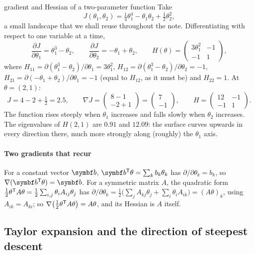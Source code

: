 \documentclass[11pt]{article}
\begin{document}
\begin{worked}{gradient and Hessian of a two-parameter function}
Take
\[
  J(\theta_1, \theta_2) = \tfrac14\theta_1^4 - \theta_1\theta_2 + \tfrac12\theta_2^2 ,
\]
a small landscape that we shall reuse throughout the note. Differentiating with respect to one variable at a time,
\[
  \frac{\partial J}{\partial\theta_1} = \theta_1^3 - \theta_2, \qquad
  \frac{\partial J}{\partial\theta_2} = -\theta_1 + \theta_2, \qquad
  H(\theta) = \begin{pmatrix} 3\theta_1^2 & -1 \\ -1 & 1 \end{pmatrix},
\]
where $H_{11} = \partial(\theta_1^3 - \theta_2)/\partial\theta_1 = 3\theta_1^2$, $H_{12} = \partial(\theta_1^3 - \theta_2)/\partial\theta_2 = -1$,
$H_{21} = \partial(-\theta_1 + \theta_2)/\partial\theta_1 = -1$ (equal to $H_{12}$, as it must be) and $H_{22} = 1$.
At $\theta = (2, 1)$:
\[
  J = 4 - 2 + \tfrac12 = 2.5, \qquad \nabla J = \begin{pmatrix} 8 - 1 \\ -2 + 1 \end{pmatrix} = \begin{pmatrix} 7 \\ -1 \end{pmatrix}, \qquad
  H = \begin{pmatrix} 12 & -1 \\ -1 & 1 \end{pmatrix}.
\]
The function rises steeply when $\theta_1$ increases and falls slowly when $\theta_2$ increases. The eigenvalues of
$H(2,1)$ are $0.91$ and $12.09$: the surface curves upwards in every direction there, much more strongly along
(roughly) the $\theta_1$ axis.
\end{worked}

\paragraph{Two gradients that recur} For a constant vector $\vect{b}$, $\vect{b}\T\theta = \sum_k b_k\theta_k$ has
$\partial/\partial\theta_k = b_k$, so $\nabla(\vect{b}\T\theta) = \vect{b}$. For a symmetric matrix $A$, the quadratic
form $\frac12\theta^{\mathsf{T}} A\theta = \frac12\sum_{i,j}\theta_i A_{ij}\theta_j$ has
$\partial/\partial\theta_k = \frac12\big(\sum_j A_{kj}\theta_j + \sum_i \theta_i A_{ik}\big) = (A\theta)_k$, using
$A_{ik} = A_{ki}$; so $\nabla\big(\frac12\theta^{\mathsf{T}} A\theta\big) = A\theta$, and its Hessian is $A$ itself.

\subsection{Taylor expansion and the direction of steepest descent}
\end{document}
